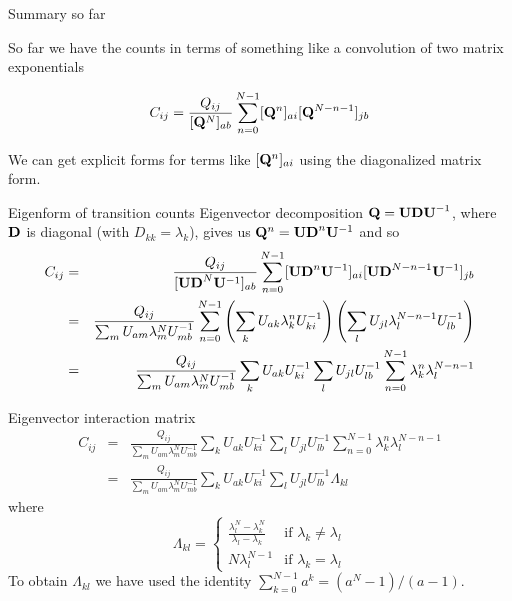 \documentclass{beamer}
\begin{document}
\begin{frame}{Summary so far}

So far we have the counts in terms of something like a convolution of two matrix exponentials

\[
C_{ij} = \frac{Q_{ij}}{[{\bf Q}^N]_{ab}} \sum_{n=0}^{N-1} [{\bf Q}^n]_{ai} [{\bf Q}^{N-n-1}]_{jb}
\]

We can get explicit forms for terms like $[{\bf Q}^n]_{ai}$ using the diagonalized matrix form.

\end{frame}

\begin{frame}{Eigenform of transition counts}
Eigenvector decomposition ${\bf Q} = {\bf UDU}^{-1}$, where ${\bf D}$ is diagonal (with $D_{kk} = \lambda_k$),
gives us ${\bf Q}^n = {\bf UD}^n {\bf U}^{-1}$ and so
\begin{eqnarray*}
C_{ij} & = & \frac{Q_{ij}}{[{\bf UD}^N {\bf U}^{-1}]_{ab}}
\sum_{n=0}^{N-1} [{\bf UD}^n {\bf U}^{-1}]_{ai} [{\bf UD}^{N-n-1} {\bf U}^{-1}]_{jb} \\
& = & \frac{Q_{ij}}{\sum_m U_{am} \lambda^N_m U^{-1}_{mb}} \sum_{n=0}^{N-1}
\left( \sum_k U_{ak} \lambda_k^n U^{-1}_{ki} \right)
\left( \sum_l U_{jl} \lambda_l^{N-n-1} U^{-1}_{lb} \right) \\
& = & \frac{Q_{ij}}{\sum_m U_{am} \lambda^N_m U^{-1}_{mb}}
\sum_k U_{ak} U^{-1}_{ki} \sum_l U_{jl} U^{-1}_{lb}
\sum_{n=0}^{N-1} \lambda_k^n \lambda_l^{N-n-1}
\end{eqnarray*}
\end{frame}

\begin{frame}{Eigenvector interaction matrix}
\begin{eqnarray*}
C_{ij} & = & \frac{Q_{ij}}{\sum_m U_{am} \lambda^N_m U^{-1}_{mb}}
\sum_k U_{ak} U^{-1}_{ki} \sum_l U_{jl} U^{-1}_{lb}
\sum_{n=0}^{N-1} \lambda_k^n \lambda_l^{N-n-1}  \\
& = & \frac{Q_{ij}}{\sum_m U_{am} \lambda^N_m U^{-1}_{mb}}
\sum_k U_{ak} U^{-1}_{ki} \sum_l U_{jl} U^{-1}_{lb} \Lambda_{kl}
\end{eqnarray*}
where
\[
\Lambda_{kl} = \left\{ \begin{array}{ll}
\displaystyle
\frac{\lambda_l^N - \lambda_k^N}{\lambda_l - \lambda_k} & \mbox{if $\lambda_k \neq \lambda_l$} \\
N \lambda_l^{N-1} & \mbox{if $\lambda_k = \lambda_l$}
\end{array} \right.
\]
To obtain $\Lambda_{kl}$ we have used the identity $\sum_{k=0}^{N-1} a^k = (a^N - 1)/(a-1)$.
\end{frame}
\end{document}
